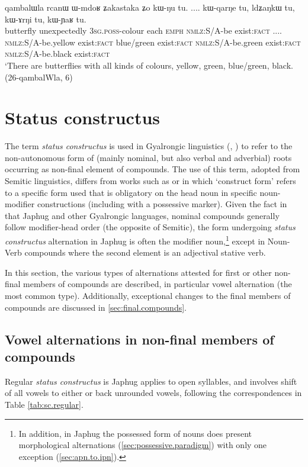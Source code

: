 \begin{exe}
\ex \label{ex:ldZaNkW}
 \gll qambalɯla rcanɯ ɯ-mdoʁ ʑakastaka ʑo kɯ-ŋu tu. .... kɯ-qarŋe tu, ldʑaŋkɯ tu, kɯ-ɤrŋi tu, kɯ-ɲaʁ tu. \\
 butterfly unexpectedly \textsc{3sg}.\textsc{poss}-colour each \textsc{emph} \textsc{nmlz}:S/A-be exist:\textsc{fact} .... \textsc{nmlz}:S/A-be.yellow exist:\textsc{fact} blue/green exist:\textsc{fact}  \textsc{nmlz}:S/A-be.green exist:\textsc{fact} \textsc{nmlz}:S/A-be.black exist:\textsc{fact}\\
 \glt `There are butterflies with all kinds of colours, yellow, green, blue/green, black. (26-qambalWla, 6)
\end{exe}
 
\section{Status constructus} \label{sec:status.constructus}
The term \textit{status constructus} is used in Gyalrongic linguistics (\citealt{jacques12incorp}, \citealt[163-4]{lai17khroskyabs}) to refer to the non-autonomous form of (mainly nominal, but also verbal and adverbial) roots occurring as non-final element of compounds. The use of this term, adopted from Semitic linguistics,  differs from works such as \citet{creissels06hongrois} or \citet{creissels17construct} in which `construct form' refers to a specific form used that is obligatory on the head noun in specific noun-modifier constructions (including with a possessive marker). Given the fact in that Japhug and other Gyalrongic languages, nominal compounds generally follow modifier-head order (the opposite of Semitic), the form undergoing \textit{status constructus} alternation in Japhug is often the modifier noun,\footnote{In addition, in Japhug the possessed form of nouns does present morphological alternations (\ref{sec:possessive.paradigm}) with only one exception (\ref{sec:apn.to.ipn}).} except in Noun-Verb compounds where the second element is an adjectival stative verb.

In this section, the various types of alternations attested for first or other non-final members of compounds are described, in particular vowel alternation (the most common type). Additionally, exceptional changes to the final members of compounds are discussed in \ref{sec:final.compounds}.

\subsection{Vowel alternations in non-final members of compounds} \label{sec:vowel.alternations.compounds}
Regular \textit{status constructus} is Japhug applies to open syllables, and involves shift of all vowels to either  or  back unrounded vowels, following the correspondences in Table \ref{tab:sc.regular}.

